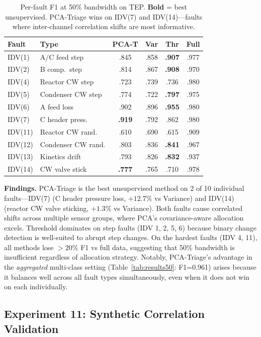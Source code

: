 \documentclass[journal]{IEEEtran}
\begin{document}
\begin{table}[t]
\centering
\caption{Per-fault F1 at 50\% bandwidth on TEP. \textbf{Bold} = best unsupervised. PCA-Triage wins on IDV(7) and IDV(14)---faults where inter-channel correlation shifts are most informative.}
\begin{tabular}{@{}llcccc@{}}
\toprule
\textbf{Fault} & \textbf{Type} & \textbf{PCA-T} & \textbf{Var} & \textbf{Thr} & \textbf{Full} \\
\midrule
IDV(1) & A/C feed step & .845 & .858 & \textbf{.907} & .977 \\
IDV(2) & B comp.\ step & .814 & .867 & \textbf{.908} & .970 \\
IDV(4) & Reactor CW step & .723 & .739 & .736 & .980 \\
IDV(5) & Condenser CW step & .774 & .722 & \textbf{.797} & .975 \\
IDV(6) & A feed loss & .902 & .896 & \textbf{.955} & .980 \\
IDV(7) & C header press. & \textbf{.919} & .792 & .862 & .980 \\
IDV(11) & Reactor CW rand. & .610 & .690 & .615 & .909 \\
IDV(12) & Condenser CW rand. & .803 & .836 & \textbf{.841} & .967 \\
IDV(13) & Kinetics drift & .793 & .826 & \textbf{.832} & .937 \\
IDV(14) & CW valve stick & \textbf{.777} & .765 & .710 & .978 \\
\bottomrule
\end{tabular}
\label{tab:perfault}
\end{table}

\textbf{Findings.} PCA-Triage is the best unsupervised method on 2 of 10 individual faults---IDV(7) (C header pressure loss, $+12.7\%$ vs Variance) and IDV(14) (reactor CW valve sticking, $+1.3\%$ vs Variance). Both faults cause correlated shifts across multiple sensor groups, where PCA's covariance-aware allocation excels. Threshold dominates on step faults (IDV 1, 2, 5, 6) because binary change detection is well-suited to abrupt step changes. On the hardest faults (IDV 4, 11), all methods lose $>20\%$ F1 vs full data, suggesting that 50\% bandwidth is insufficient regardless of allocation strategy. Notably, PCA-Triage's advantage in the \textit{aggregated} multi-class setting (Table~\ref{tab:results50}: F1=0.961) arises because it balances well across all fault types simultaneously, even when it does not win on each individually.

\subsection{Experiment 11: Synthetic Correlation Validation}
\end{document}
